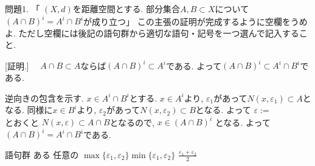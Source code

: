 \documentclass[dvipdfmx,a4paper,11pt]{article}
\theoremstyle{definition}
\begin{document}
 \medskip
 問題1. 「 $(X, d)$を距離空間とする. 部分集合$A, B \subset X$について$(A \cap B)^{i}=A^i \cap B^i$が成り立つ」
この主張の証明が完成するように空欄をうめよ. ただし空欄には後記の語句群から適切な語句・記号を一つ選んで記入すること.

 [証明.]　
 $A \cap B \subset A$ならば$(A \cap B)^i \subset A^i$である.
 よって$(A \cap B)^{i} \subset A^i \cap B^i$である.
 
 逆向きの包含を示す. 
 $x \in A^i \cap B^i$とする.
$x \in A^i$より, \boxed{\phantom{hogehoge}}$\varepsilon_1$があって$N(x, \varepsilon_1) \subset A$となる. 
同様に$x \in B^i$より, \boxed{\phantom{hogehoge}}$\varepsilon_2$があって$N(x, \varepsilon_2) \subset B$となる. 
よって
$\varepsilon:=\boxed{\phantom{hogehoge}}$とおくと
$N(x, \varepsilon) \subset A \cap B $となるので, $x \in (A \cap B)^{i}$
となる. よって$(A \cap B)^{i}=A^i \cap B^i$である. 

  \begin{itembox}[l]{語句群}
ある \quad 任意の \quad  $\max\{ \varepsilon_1, \varepsilon_2\} $\quad $\min\{ \varepsilon_1, \varepsilon_2\} $ \quad $\frac{\varepsilon_1 + \varepsilon_2}{2}$
\end{itembox}
 

\newpage
\end{document}

